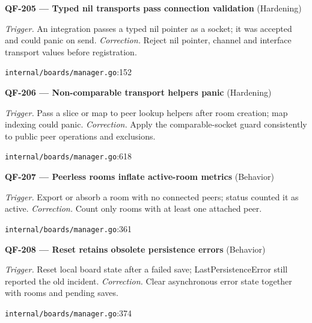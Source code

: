 \begin{minipage}{\linewidth}
\textbf{QF-205 --- Typed nil transports pass connection validation} {\scriptsize\color{accent}(Hardening)}\par
\textit{Trigger.} An integration passes a typed nil pointer as a socket; it was accepted and could panic on send. \textit{Correction.} Reject nil pointer, channel and interface transport values before registration.\par
{\scriptsize\color{muted}\nolinkurl{internal/boards/manager.go}:152}\par
\end{minipage}\par\vspace{7pt}
\begin{minipage}{\linewidth}
\textbf{QF-206 --- Non-comparable transport helpers panic} {\scriptsize\color{accent}(Hardening)}\par
\textit{Trigger.} Pass a slice or map to peer lookup helpers after room creation; map indexing could panic. \textit{Correction.} Apply the comparable-socket guard consistently to public peer operations and exclusions.\par
{\scriptsize\color{muted}\nolinkurl{internal/boards/manager.go}:618}\par
\end{minipage}\par\vspace{7pt}
\begin{minipage}{\linewidth}
\textbf{QF-207 --- Peerless rooms inflate active-room metrics} {\scriptsize\color{accent}(Behavior)}\par
\textit{Trigger.} Export or absorb a room with no connected peers; status counted it as active. \textit{Correction.} Count only rooms with at least one attached peer.\par
{\scriptsize\color{muted}\nolinkurl{internal/boards/manager.go}:361}\par
\end{minipage}\par\vspace{7pt}
\begin{minipage}{\linewidth}
\textbf{QF-208 --- Reset retains obsolete persistence errors} {\scriptsize\color{accent}(Behavior)}\par
\textit{Trigger.} Reset local board state after a failed save; LastPersistenceError still reported the old incident. \textit{Correction.} Clear asynchronous error state together with rooms and pending saves.\par
{\scriptsize\color{muted}\nolinkurl{internal/boards/manager.go}:374}\par
\end{minipage}\par\vspace{7pt}
